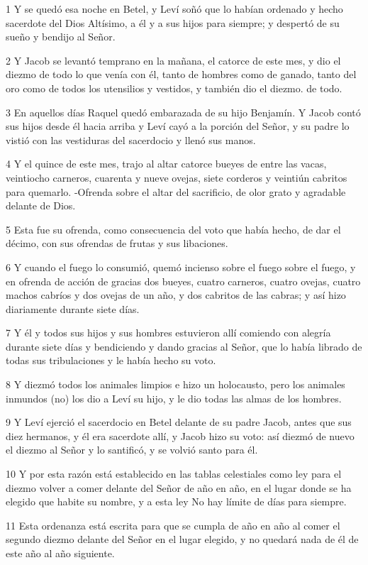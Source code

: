 \par 1 Y se quedó esa noche en Betel, y Leví soñó que lo habían ordenado y hecho sacerdote del Dios Altísimo, a él y a sus hijos para siempre; y despertó de su sueño y bendijo al Señor.
\par 2 Y Jacob se levantó temprano en la mañana, el catorce de este mes, y dio el diezmo de todo lo que venía con él, tanto de hombres como de ganado, tanto del oro como de todos los utensilios y vestidos, y también dio el diezmo. de todo.
\par 3 En aquellos días Raquel quedó embarazada de su hijo Benjamín. Y Jacob contó sus hijos desde él hacia arriba y Leví cayó a la porción del Señor, y su padre lo vistió con las vestiduras del sacerdocio y llenó sus manos.
\par 4 Y el quince de este mes, trajo al altar catorce bueyes de entre las vacas, veintiocho carneros, cuarenta y nueve ovejas, siete corderos y veintiún cabritos para quemarlo. -Ofrenda sobre el altar del sacrificio, de olor grato y agradable delante de Dios.
\par 5 Esta fue su ofrenda, como consecuencia del voto que había hecho, de dar el décimo, con sus ofrendas de frutas y sus libaciones.
\par 6 Y cuando el fuego lo consumió, quemó incienso sobre el fuego sobre el fuego, y en ofrenda de acción de gracias dos bueyes, cuatro carneros, cuatro ovejas, cuatro machos cabríos y dos ovejas de un año, y dos cabritos de las cabras; y así hizo diariamente durante siete días.
\par 7 Y él y todos sus hijos y sus hombres estuvieron allí comiendo con alegría durante siete días y bendiciendo y dando gracias al Señor, que lo había librado de todas sus tribulaciones y le había hecho su voto.
\par 8 Y diezmó todos los animales limpios e hizo un holocausto, pero los animales inmundos (no) los dio a Leví su hijo, y le dio todas las almas de los hombres.
\par 9 Y Leví ejerció el sacerdocio en Betel delante de su padre Jacob, antes que sus diez hermanos, y él era sacerdote allí, y Jacob hizo su voto: así diezmó de nuevo el diezmo al Señor y lo santificó, y se volvió santo para él.
\par 10 Y por esta razón está establecido en las tablas celestiales como ley para el diezmo volver a comer delante del Señor de año en año, en el lugar donde se ha elegido que habite su nombre, y a esta ley No hay límite de días para siempre.
\par 11 Esta ordenanza está escrita para que se cumpla de año en año al comer el segundo diezmo delante del Señor en el lugar elegido, y no quedará nada de él de este año al año siguiente.
